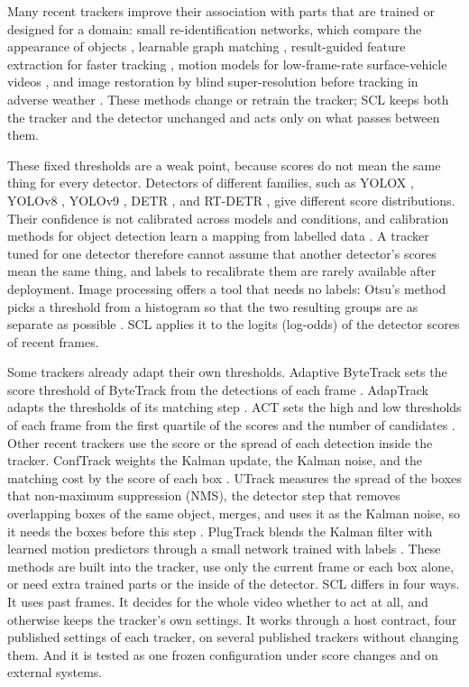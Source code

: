 \documentclass[pdflatex,sn-mathphys-num,iicol]{sn-jnl}
\newcommand{\scl}{SCL}
\begin{document}
Many recent trackers improve their association with parts that are trained or
designed for a domain: small re-identification networks, which compare the
appearance of objects \cite{li2024fdbtrack}, learnable graph matching
\cite{bao2024graphmatching,zhang2025sinkhorn}, result-guided feature
extraction for faster tracking \cite{ding2025remot}, motion models for
low-frame-rate surface-vehicle videos \cite{liang2024motiontrack}, and image
restoration by blind super-resolution before tracking in adverse weather
\cite{sun2026bsr}. These methods change or retrain the tracker; \scl{} keeps
both the tracker and the detector unchanged and acts only on what passes
between them.

These fixed thresholds are a weak point, because scores do not mean the same
thing for every detector. Detectors of different families, such as YOLOX
\cite{ge2021yolox}, YOLOv8 \cite{jocher2023yolov8}, YOLOv9
\cite{wang2024yolov9}, DETR \cite{carion2020detr}, and RT-DETR
\cite{zhao2024rtdetr}, give different score distributions. Their confidence
is not calibrated across models and conditions, and calibration methods for
object detection learn a mapping from labelled data
\cite{kuppers2020detcalib}. A tracker tuned for one detector therefore cannot
assume that another detector's scores mean the same thing, and labels to
recalibrate them are rarely available after deployment. Image processing
offers a tool that needs no labels: Otsu's method picks a threshold from a
histogram so that the two resulting groups are as separate as possible
\cite{otsu1979}. \scl{} applies it to the logits (log-odds) of the detector
scores of recent frames.

Some trackers already adapt their own thresholds. Adaptive ByteTrack sets the
score threshold of ByteTrack from the detections of each frame
\cite{ma2023adaptivebytetrack}. AdapTrack adapts the thresholds of its
matching step \cite{shim2024adaptrack}. ACT sets the high and low thresholds
of each frame from the first quartile of the scores and the number of
candidates \cite{act2026adaptive}. Other recent trackers use the score or the
spread of each detection inside the tracker. ConfTrack weights the Kalman
update, the Kalman noise, and the matching cost by the score of each box
\cite{jung2024conftrack}. UTrack measures the spread of the boxes that
non-maximum suppression (NMS), the detector step that removes overlapping boxes
of the same object, merges, and uses it as the Kalman noise, so it needs the
boxes before this step \cite{solano2025utrack}. PlugTrack blends the Kalman
filter with learned motion predictors through a small network trained with
labels \cite{kim2026plugtrack}. These methods are built into the tracker, use
only the current frame or each box alone, or need extra trained parts or the
inside of the detector. \scl{} differs in four ways. It uses past
frames. It decides for the whole video whether to act at all, and otherwise
keeps the tracker's own settings. It works through a host contract, four published
settings of each tracker, on several published trackers without changing them. And it is tested as one
frozen configuration under score changes and on external systems.
\end{document}
